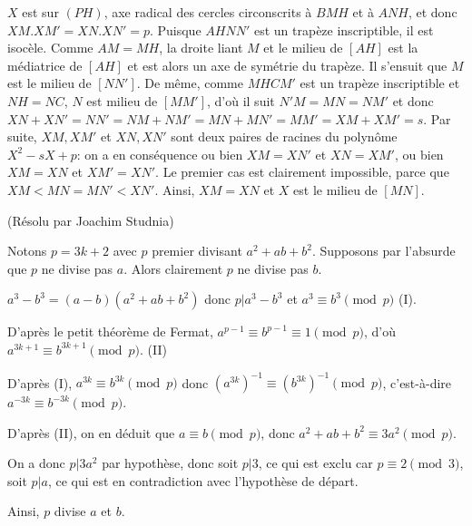 \begin{sol}[119]
		$X$ est sur $(PH)$, axe radical des cercles circonscrits \`a $BMH$ et \`a $ANH$, et donc $XM.XM'=XN.XN'=p$. Puisque $AHNN'$ est un trap\`eze inscriptible, il est isoc\`ele. Comme $AM=MH$, la droite liant $M$ et le milieu de $[AH]$ est la m\'ediatrice de $[AH]$ et est alors un axe de sym\'etrie du trap\`eze. Il s'ensuit que $M$ est le milieu de $[NN']$. De m\^eme, comme $MHCM'$ est un trap\`eze inscriptible et $NH=NC$, $N$ est milieu de $[MM']$, d'o\`u il suit $N'M=MN=NM'$ et donc $XN+XN'=NN'=NM+NM'=MN+MN'=MM'=XM+XM'=s$. Par suite, $XM,XM'$ et $XN,XN'$ sont deux paires de racines du polyn\^ome $X^2-sX+p$: on a en cons\'equence ou bien $XM=XN'$ et $XN=XM'$, ou bien $XM=XN$ et $XM'=XN'$. Le premier cas est clairement impossible, parce que $XM < MN=MN' <XN'$. Ainsi, $XM=XN$ et $X$ est le milieu de $[MN]$.  
\end{sol}
 

\begin{sol}[126](Résolu par Joachim Studnia)

Notons $p=3k+2$ avec $p$ premier divisant $a^2+ab+b^2$. Supposons par l'absurde que $p$ ne divise pas $a$. Alors clairement $p$ ne divise pas $b$.

$a^3-b^3 = (a-b)(a^2+ab+b^2)$ donc $p | a^3-b^3$ et $a^3 \equiv b^3 \pmod p$ (I).

D'après le petit théorème de Fermat, \mbox{$a^{p-1} \equiv b^{p-1} \equiv 1 \pmod p$}, d'où \mbox{$a^{3k+1} \equiv b^{3k+1} \pmod p$}. (II)

D'après (I), $a^{3k} \equiv b^{3k} \pmod p$ donc $(a^{3k})^{-1} \equiv (b^{3k})^{-1} \pmod p$, c'est-à-dire $a^{-3k} \equiv b^{-3k} \pmod p$.

D'après (II), on en déduit que $a \equiv b \pmod p$, donc \mbox{$a^2+ab+b^2 \equiv 3a^2 \pmod p$}.

On a donc $p | 3a^2$ par hypothèse, donc soit $p | 3$, ce qui est exclu car \mbox{$p \equiv 2 \pmod 3$}, soit $p |a$, ce qui est en contradiction avec l'hypothèse de départ.

Ainsi, $p$ divise $a$ et $b$.

\end{sol}

